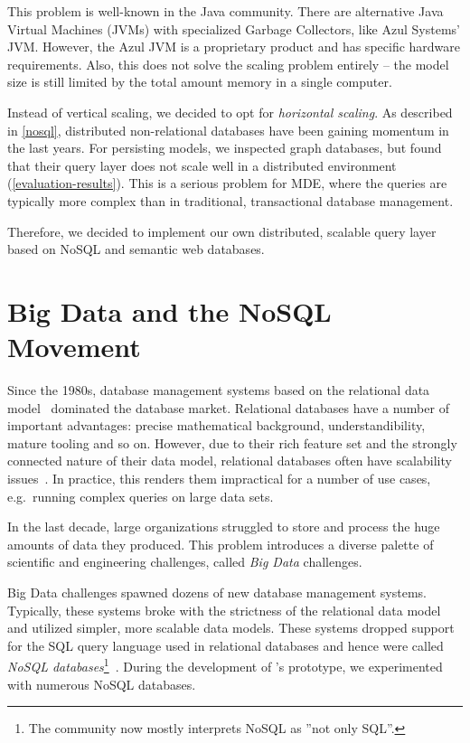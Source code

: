 This problem is well-known in the Java community. There are alternative Java Virtual Machines (JVMs) with specialized Garbage Collectors, like Azul Systems' JVM. However, the Azul JVM is a proprietary product and has specific hardware requirements. Also, this does not solve the scaling problem entirely -- the model size is still limited by the total amount memory in a single computer.

Instead of vertical scaling, we decided to opt for \emph{horizontal scaling}. As described in \autoref{nosql}, distributed non-relational databases have been gaining momentum in the last years. For persisting models, we inspected graph databases, but found that their query layer does not scale well in a distributed environment (\autoref{evaluation-results}). This is a serious problem for MDE, where the queries are typically more complex than in traditional, transactional database management.

Therefore, we decided to implement our own distributed, scalable query layer based on NoSQL and semantic web databases.


\section{Big Data and the NoSQL Movement}
\label{nosql}

Since the 1980s, database management systems based on the relational data model~\cite{Codd:1970:RMD:362384.362685} dominated the database market. Relational databases have a number of important advantages: precise mathematical background, understandibility, mature tooling and so on. However, due to their rich feature set and the strongly connected nature of their data model, relational databases often have scalability issues~\cite{Jacobs:2009:PBD:1536616.1536632, Sakr13}. In practice, this renders them impractical for a number of use cases, e.g.\ running complex queries on large data sets.

In the last decade, large organizations struggled to store and process the huge amounts of data they produced. This problem introduces a diverse palette of scientific and engineering challenges, called \emph{Big Data} challenges. 

Big Data challenges spawned dozens of new database management systems. Typically, these systems broke with the strictness of the relational data model and utilized simpler, more scalable data models. These systems dropped support for the SQL query language used in relational databases and hence were called \emph{NoSQL databases}\footnote{The community now mostly interprets NoSQL as ''not only SQL''.}~\cite{NoSQL}. During the development of \iqd{}'s prototype, we experimented with numerous NoSQL databases.



